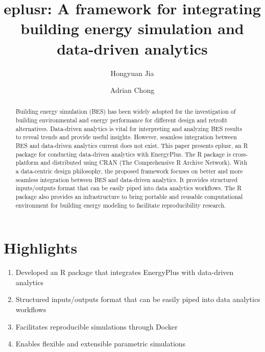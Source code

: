 \documentclass[3p, times]{elsarticle} %
\providecommand{\tightlist}{%
  \setlength{\itemsep}{0pt}\setlength{\parskip}{0pt}}
\begin{document}
\begin{frontmatter}

  \title{eplusr: A framework for integrating building energy simulation and data-driven analytics}
    \author[SinBerBEST]{Hongyuan Jia}
    \author[NUS]{Adrian Chong}
      \address[SinBerBEST]{SinBerBEST Program, Berkeley Education Alliance for Research in Singapore,
Singapore, 138602, Singapore}
    \address[NUS]{Department of Building, School of Design and Environment, National
University of Singapore, 4 Architecture Drive, Singapore, 117566,
Singapore}
  
  \begin{abstract}
  Building energy simulation (BES) has been widely adopted for the
  investigation of building environmental and energy performance for different
  design and retrofit alternatives.
  Data-driven analytics is vital for interpreting and analyzing BES results to
  reveal trends and provide useful insights.
  However, seamless integration between BES and data-driven analytics current
  does not exist.
  This paper presents eplusr, an R package for conducting data-driven analytics
  with EnergyPlus.
  The R package is cross-platform and distributed using CRAN (The Comprehensive
  R Archive Network).
  With a data-centric design philosophy, the proposed framework focuses on
  better and more seamless integration between BES and data-driven analytics.
  It provides structured inputs/outputs format that can be easily piped into
  data analytics workflows.
  The R package also provides an infrastructure to bring portable and reusable
  computational environment for building energy modeling to facilitate
  reproducibility research.
  \end{abstract}
  
 \end{frontmatter}

\hypertarget{highlights}{%
\section*{Highlights}\label{highlights}}

\begin{enumerate}
\def\labelenumi{\arabic{enumi}.}
\tightlist
\item
  Developed an R package that integrates EnergyPlus with data-driven analytics
\item
  Structured inputs/outputs format that can be easily piped into data
  analytics workflows
\item
  Facilitates reproducible simulations through Docker
\item
  Enables flexible and extensible parametric simulations
\end{enumerate}
\end{document}
